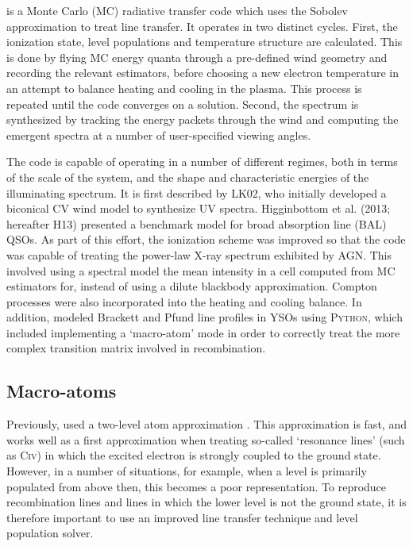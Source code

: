 \documentclass[preprint, a4paper, 11pt]{aastex}
\begin{document}
\py is a Monte Carlo (MC) radiative transfer code which uses
the Sobolev approximation to treat line transfer. It operates 
in two distinct cycles. First, the ionization state, level populations
and temperature structure are calculated. This is done by
flying MC energy quanta through a pre-defined wind geometry and recording
the relevant estimators, before choosing  a new electron temperature 
in an attempt to balance heating and cooling in the plasma.
This process is repeated until the code converges on a 
solution. Second, the spectrum is synthesized by tracking
the energy packets through the wind and computing the 
emergent spectra at a number of user-specified viewing angles.

The code is capable of operating in a number of different
regimes, both in terms of the scale of the system, and the 
shape and characteristic energies of the illuminating spectrum. It is 
first described by LK02, who initially developed a biconical CV 
wind model to synthesize UV spectra. 
Higginbottom et al.\nocite{higginbottom2013} (2013; hereafter H13) presented a 
benchmark model for broad absorption line (BAL) QSOs.
As part of this effort, the ionization scheme was improved so that 
the code was capable of treating the power-law X-ray spectrum
exhibited by AGN.
This involved using a spectral model the mean intensity in a cell
computed from MC estimators for, instead of using a dilute blackbody
approximation. Compton processes
were also incorporated into the heating and cooling balance.
In addition, \cite{simmacro2005} modeled
Brackett and Pfund line profiles in YSOs using \textsc{Python,} which included
implementing a `macro-atom' mode in order to correctly treat the more
complex transition matrix involved in recombination. 



\subsection{Macro-atoms}

Previously, \py used a two-level atom approximation \cite[see e.g.][]{mihalas}. This approximation is 
fast, and works well as a first approximation when treating so-called `resonance lines' (such as C\textsc{iv}) 
in which the excited electron is strongly coupled to the ground state.
However, in a number of situations, for example, when a level is primarily populated from above then,
this becomes a poor representation. 
To reproduce recombination lines and lines in which the lower level is not the ground state, 
it is therefore important to use an improved line transfer technique and level population solver.
\end{document}
